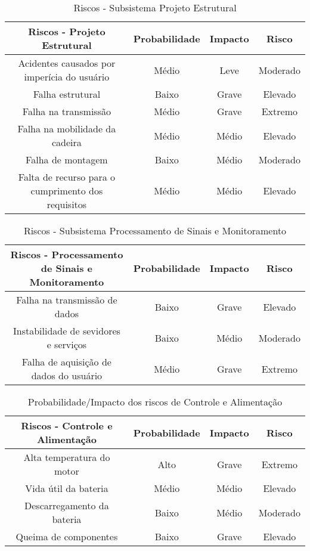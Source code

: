 \begin{table}[h]
\centering
\vspace{0.5cm}
\begin{tabular}{|c|c|c|c|}
\hline
    Riscos - Projeto Estrutural    & Probabilidade & Impacto & Risco \\
\hline
    Acidentes causados por imperícia do usuário         & Médio & Leve & Moderado \\
    Falha estrutural                                    & Baixo & Grave & Elevado \\
    Falha na transmissão                                & Médio & Grave & Extremo \\
    Falha na mobilidade da cadeira                      & Médio & Médio & Elevado \\
    Falha de montagem                                   & Baixo & Médio & Moderado \\
    Falta de recurso para o cumprimento dos requisitos  & Médio & Médio & Elevado \\
\hline
\end{tabular}
\caption{Riscos - Subsistema Projeto Estrutural}
\label{tab:probimpest}
\end{table}

\begin{table}[h]
\centering
\vspace{0.5cm}
\begin{tabular}{|c|c|c|c|}
\hline
    Riscos - Processamento de Sinais e Monitoramento       & Probabilidade & Impacto & Risco \\
\hline
    Falha na transmissão de dados           & Baixo         & Grave & Elevado \\
    Instabilidade de sevidores e serviços   & Baixo         & Médio & Moderado \\
    Falha de aquisição de dados do usuário  & Médio         & Grave & Extremo \\
\hline
\end{tabular}
\caption{Riscos - Subsistema Processamento de Sinais e Monitoramento}
\label{tab:probimpcontrole}
\end{table}

\begin{table}[h]
\centering
\vspace{0.5cm}
\begin{tabular}{|c|c|c|c|}
\hline
    Riscos - Controle e Alimentação        & Probabilidade & Impacto & Risco \\
\hline
    Alta temperatura do motor   & Alto          & Grave & Extremo \\
    Vida útil da bateria        & Médio         & Médio & Elevado \\
    Descarregamento da bateria  & Baixo         & Médio & Moderado\\
    Queima de componentes & Baixo & Grave & Elevado \\
\hline
\end{tabular}
\caption{Probabilidade/Impacto dos riscos de Controle e Alimentação}
\label{tab:probimpalim}
\end{table}

